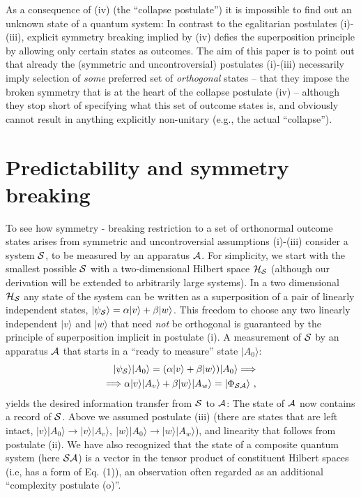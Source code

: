\documentclass[aps,twocolumn,pra]{revtex4}
\newcommand{\ket}[1]    {| #1 \rangle}
\newcommand{\+}         {\dagger}
\begin{document}
As a consequence of (iv) (the ``collapse postulate'') it is impossible to find out an unknown state of a quantum system: In contrast to the egalitarian postulates (i)-(iii), explicit symmetry breaking implied by (iv) defies the superposition principle by allowing only certain states as outcomes. 
The aim of this paper is to point out that already the (symmetric and uncontroversial) postulates (i)-(iii) necessarily imply selection of  {\it some} preferred set of {\it orthogonal} states -- that they impose the broken symmetry that is at the heart of the collapse postulate (iv) -- although they stop short of specifying what this set of outcome states is, and obviously cannot result in anything explicitly non-unitary 
(e.g., the actual ``collapse''). 

 \section{Predictability and symmetry breaking}

To see how symmetry - breaking restriction to a set of orthonormal outcome states arises from 
symmetric and uncontroversial assumptions (i)-(iii) consider a system ${\cal S}$, to be 
measured by an apparatus ${\cal A}$. For simplicity, we start with the smallest possible ${\cal S}$ 
with a two-dimensional Hilbert space ${\cal H}_{\cal S}$ (although our derivation will be extended to arbitrarily large systems). In a two dimensional ${\cal H}_{\cal S}$ any state of the system can be written as a superposition of a pair of linearly independent states, $\ket {\psi_{\cal S}} = \alpha \ket v + \beta \ket w $. This freedom to choose any two linearly independent $\ket v$ and $\ket w$ that need {\it not} be orthogonal is guaranteed by the principle of superposition implicit in postulate (i). A measurement of ${\cal S}$ by an apparatus ${\cal A}$ that starts in a ``ready to measure'' state $\ket {A_0}$:
\begin{eqnarray}
\ket {\psi_{\cal S}}\ket {A_0}=( \alpha \ket v + \beta \ket w )\ket {A_0} \Longrightarrow \nonumber \\
 \Longrightarrow \alpha \ket v \ket {A_v}+ \beta \ket w \ket {A_w} = \ket {\Phi_{\cal SA}} \ ,
\end{eqnarray}
yields the desired information transfer from ${\cal S}$ to ${\cal A}$: The state of ${\cal A}$ now contains a record of ${\cal S}$. 
Above we assumed postulate (iii) (there are states that are left intact, $ \ket v \ket {A_0} \rightarrow \ket v \ket {A_v}, \ \ket w \ket {A_0} \rightarrow \ket w \ket {A_w} $),
and  linearity that follows from postulate (ii). We have also recognized that the state of a composite quantum system (here ${\cal SA}$) is a vector in the tensor product of constituent Hilbert spaces (i.e, has a form of Eq. (1)), an observation often regarded as an additional ``complexity postulate (o)''. 
\end{document}
